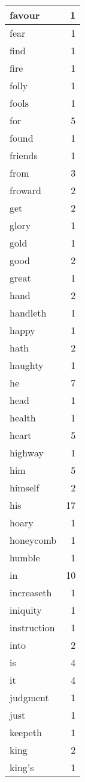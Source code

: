 \begin{center}
\begin{longtable}{l|r}
favour & 1\\ \hline 
fear & 1\\ \hline 
find & 1\\ \hline 
fire & 1\\ \hline 
folly & 1\\ \hline 
fools & 1\\ \hline 
for & 5\\ \hline 
found & 1\\ \hline 
friends & 1\\ \hline 
from & 3\\ \hline 
froward & 2\\ \hline 
get & 2\\ \hline 
glory & 1\\ \hline 
gold & 1\\ \hline 
good & 2\\ \hline 
great & 1\\ \hline 
hand & 2\\ \hline 
handleth & 1\\ \hline 
happy & 1\\ \hline 
hath & 2\\ \hline 
haughty & 1\\ \hline 
he & 7\\ \hline 
head & 1\\ \hline 
health & 1\\ \hline 
heart & 5\\ \hline 
highway & 1\\ \hline 
him & 5\\ \hline 
himself & 2\\ \hline 
his & 17\\ \hline 
hoary & 1\\ \hline 
honeycomb & 1\\ \hline 
humble & 1\\ \hline 
in & 10\\ \hline 
increaseth & 1\\ \hline 
iniquity & 1\\ \hline 
instruction & 1\\ \hline 
into & 2\\ \hline 
is & 4\\ \hline 
it & 4\\ \hline 
judgment & 1\\ \hline 
just & 1\\ \hline 
keepeth & 1\\ \hline 
king & 2\\ \hline 
king's & 1\\ \hline 

\end{longtable}
\end{center}
